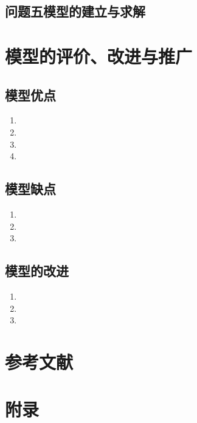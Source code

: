 \documentclass[a4paper]{article}
\begin{document}
	\subsection{问题五模型的建立与求解}
	
	
	\section{模型的评价、改进与推广}
	\subsection{模型优点}
	\begin{enumerate}
		\item 
		\item 
		\item 
		\item 
	\end{enumerate}
	
	\subsection{模型缺点}
	\begin{enumerate}
		\item 
		\item 
		\item 
	\end{enumerate}
	
	\subsection{模型的改进}
	\begin{enumerate}
		\item 
		\item 
		\item 
	\end{enumerate}
	
	\section{参考文献}
	\vspace{-2em} %
	\begin{thebibliography}{9}  
	\end{thebibliography}
	
	\newpage
	\section*{附录}
	
\end{document}
